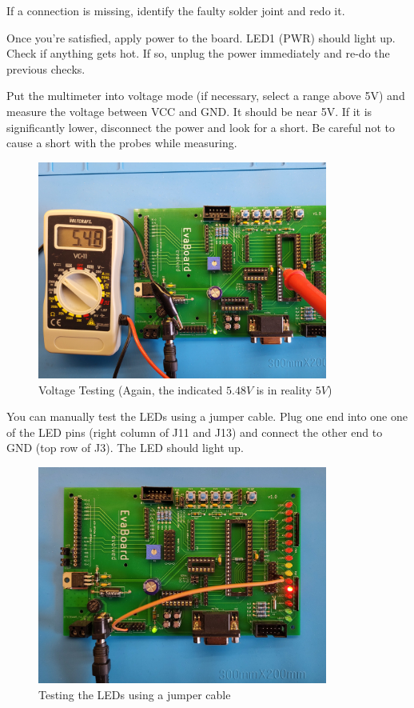 \documentclass{article}
\begin{document}
If a connection is missing, identify the faulty solder joint and redo it. 

Once you're satisfied, apply power to the board. LED1 (PWR) should light up. Check if anything gets hot. If so, unplug the power immediately and re-do the previous checks. 

Put the multimeter into voltage mode (if necessary, select a range above 5V) and measure the voltage between VCC and GND. It should be near 5V. If it is significantly lower, disconnect the power and look for a short. Be careful not to cause a short with the probes while measuring. 
\begin{figure}[htb]
\centering
\includegraphics[width=0.85\textwidth]{Pictures/Testing2.jpg}
\caption{Voltage Testing (Again, the indicated $5.48V$ is in reality $5V$)}
\label{fig:testing2}
\end{figure}

You can manually test the LEDs using a jumper cable. Plug one end into one one of the LED pins (right column of J11 and J13) and connect the other end to GND (top row of J3). The LED should light up. 
\begin{figure}[htb]
\centering
\includegraphics[width=0.85\textwidth]{Pictures/Testing3.jpg}
\caption{Testing the LEDs using a jumper cable}
\label{fig:testing3}
\end{figure}
\end{document}
